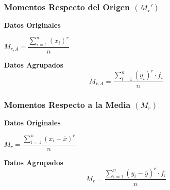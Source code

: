 \subsubsection{Momentos Respecto del Origen $(M_r')$}
\begin{multicols}{2}
\textbf{Datos Originales} 
\begin{center}
$M_{r,A}=\dfrac{\displaystyle\sum_{i=1}^{n}(x_i)^r}{n}$
\end{center}
\columnbreak
\textbf{Datos Agrupados}
$$M_{r,A}=\dfrac{\displaystyle\sum_{i=1}^{n}(y_i)^r\cdot f_i}{n}$$
\end{multicols}
\subsubsection{Momentos Respecto a la Media $(M_r)$}
\begin{multicols}{2}
\textbf{Datos Originales} 
\begin{center}
$M_{r}=\dfrac{\displaystyle\sum_{i=1}^{n}(x_i-\overline{x})^r}{n}$
\end{center}
\columnbreak
\textbf{Datos Agrupados}
$$M_{r}=\dfrac{\displaystyle\sum_{i=1}^{n}(y_i-\overline{y})^r\cdot f_i}{n}$$
\end{multicols}
